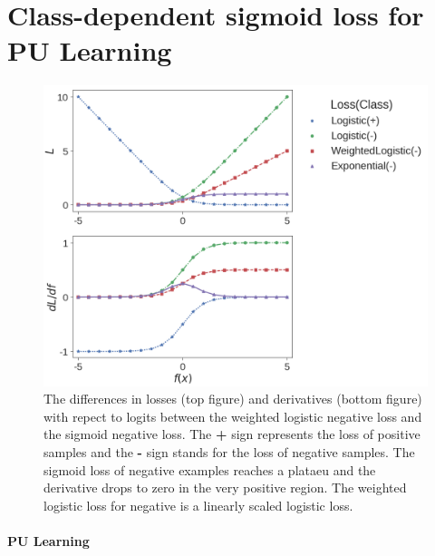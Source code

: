 \section{Class-dependent sigmoid loss for PU Learning}
\label{sec:pulearning}



\begin{figure}[t]
\centering
   \includegraphics[width=1.05\linewidth]{img/losses}
\caption{
The differences in losses (top figure) and derivatives (bottom figure) with repect to logits between the weighted logistic negative loss and the sigmoid negative loss.
The \textbf{+} sign represents the loss of positive samples and the \textbf{-} sign stands for the loss of negative samples.
The sigmoid loss of negative examples reaches a plataeu and the derivative drops to zero in the very positive region.
The weighted logistic loss for negative is a linearly scaled logistic loss.
}
\label{fig:losses}
\end{figure}


\paragraph{PU Learning}

